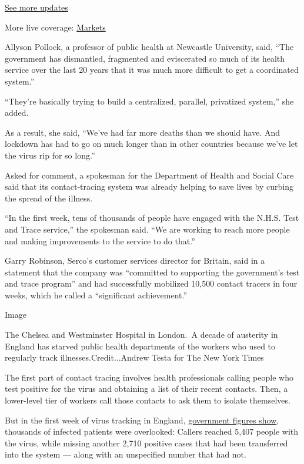 \href{https://www.nytimes3xbfgragh.onion/2020/08/20/world/coronavirus-covid.html?action=click\&pgtype=Article\&state=default\&region=MAIN_CONTENT_1\&context=storylines_live_updates}{See
more updates}

More live coverage:
\href{https://www.nytimes3xbfgragh.onion/live/2020/08/20/business/stock-market-today-coronavirus?action=click\&pgtype=Article\&state=default\&region=MAIN_CONTENT_1\&context=storylines_live_updates}{Markets}

Allyson Pollock, a professor of public health at Newcastle University,
said, ``The government has dismantled, fragmented and eviscerated so
much of its health service over the last 20 years that it was much more
difficult to get a coordinated system.''

``They're basically trying to build a centralized, parallel, privatized
system,'' she added.

As a result, she said, ``We've had far more deaths than we should have.
And lockdown has had to go on much longer than in other countries
because we've let the virus rip for so long.''

Asked for comment, a spokesman for the Department of Health and Social
Care said that its contact-tracing system was already helping to save
lives by curbing the spread of the illness.

``In the first week, tens of thousands of people have engaged with the
N.H.S. Test and Trace service,'' the spokesman said. ``We are working to
reach more people and making improvements to the service to do that.''

Garry Robinson, Serco's customer services director for Britain, said in
a statement that the company was ``committed to supporting the
government's test and trace program'' and had successfully mobilized
10,500 contact tracers in four weeks, which he called a ``significant
achievement.''

Image

The Chelsea and Westminster Hospital in London.~A decade of austerity in
England has starved public health departments of the workers who used to
regularly track illnesses.Credit...Andrew Testa for The New York Times

The first part of contact tracing involves health professionals calling
people who test positive for the virus and obtaining a list of their
recent contacts. Then, a lower-level tier of workers call those contacts
to ask them to isolate themselves.

But in the first week of virus tracking in England,
\href{https://assets.publishing.service.gov.uk/government/uploads/system/uploads/attachment_data/file/891703/NHS_test_and_trace_bulletin__England__-_28_May_to_3_June_2020.pdf}{government
figures show}, thousands of infected patients were overlooked: Callers
reached 5,407 people with the virus, while missing another 2,710
positive cases that had been transferred into the system --- along with
an unspecified number that had not.


